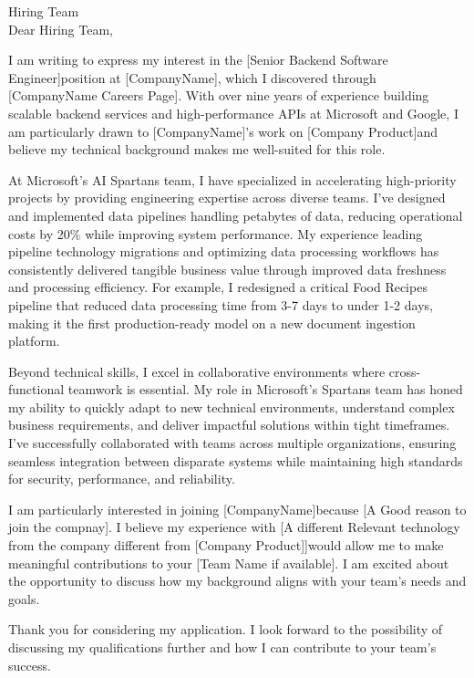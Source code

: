
\newcommand{\COMPANY}{[CompanyName]}
\newcommand{\POSITION}{[Senior Backend Software Engineer]}
\newcommand{\SOURCE}{[CompanyName Careers Page]}
\newcommand{\PRODUCT}{[Company Product]}
\newcommand{\SPECIFICREASON}{[A Good reason to join the compnay]}
\newcommand{\RELEVANTTECHNOLOGY}{[A different Relevant technology from the company different from \PRODUCT]}
\newcommand{\TEAMNAME}{[Team Name if available]}

Hiring Team\\
\COMPANY

Dear Hiring Team,

I am writing to express my interest in the \POSITION position at \COMPANY, which I discovered through \SOURCE. With over nine years of experience building scalable backend services and high-performance APIs at Microsoft and Google, I am particularly drawn to \COMPANY's work on \PRODUCT and believe my technical background makes me well-suited for this role.

At Microsoft's AI Spartans team, I have specialized in accelerating high-priority projects by providing engineering expertise across diverse teams. I've designed and implemented data pipelines handling petabytes of data, reducing operational costs by 20\% while improving system performance. My experience leading pipeline technology migrations and optimizing data processing workflows has consistently delivered tangible business value through improved data freshness and processing efficiency. For example, I redesigned a critical Food Recipes pipeline that reduced data processing time from 3-7 days to under 1-2 days, making it the first production-ready model on a new document ingestion platform.

Beyond technical skills, I excel in collaborative environments where cross-functional teamwork is essential. My role in Microsoft's Spartans team has honed my ability to quickly adapt to new technical environments, understand complex business requirements, and deliver impactful solutions within tight timeframes. I've successfully collaborated with teams across multiple organizations, ensuring seamless integration between disparate systems while maintaining high standards for security, performance, and reliability.

I am particularly interested in joining \COMPANY because \SPECIFICREASON. I believe my experience with \RELEVANTTECHNOLOGY would allow me to make meaningful contributions to your \TEAMNAME. I am excited about the opportunity to discuss how my background aligns with your team's needs and goals.

Thank you for considering my application. I look forward to the possibility of discussing my qualifications further and how I can contribute to your team's success.
